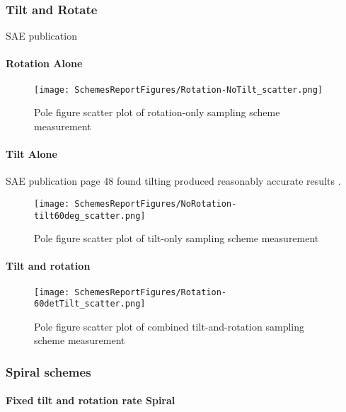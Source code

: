 \documentclass{article}
\begin{document}
\subsubsection{Tilt and Rotate}

SAE publication \citep{jatczak_sae_1980} 

\paragraph{Rotation Alone}
\begin{figure}[H]
    \centering
    \texttt{[image: SchemesReportFigures/Rotation-NoTilt\_scatter.png]}
    \caption{Pole figure scatter plot of rotation-only sampling scheme measurement}
\end{figure}

\paragraph{Tilt Alone}

SAE publication page 48 found tilting produced reasonably accurate results \cite{jatczak_sae_1980}.

\begin{figure}[H]
    \centering
    \texttt{[image: SchemesReportFigures/NoRotation-tilt60deg\_scatter.png]}
    \caption{Pole figure scatter plot of tilt-only sampling scheme measurement}
\end{figure}


\paragraph{Tilt and rotation}
\begin{figure}[H]
    \centering
    \texttt{[image: SchemesReportFigures/Rotation-60detTilt\_scatter.png]}
    \caption{Pole figure scatter plot of combined tilt-and-rotation sampling scheme measurement}
\end{figure}



\subsubsection{Spiral schemes}


\paragraph{Fixed tilt and rotation rate Spiral} 
\end{document}
